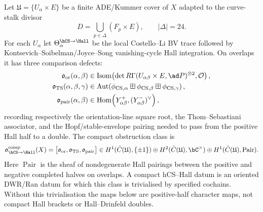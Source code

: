 \begin{definition}
\label{def:k3e-compact-hcs-hall-obstruction}
Let $\mathfrak U=\{U_\alpha\times E\}$ be a finite ADE/Kummer cover of $X$ adapted to the curve-stalk divisor
\[
D=\bigcup_{p\in\Delta}(F_p\times E),\qquad |\Delta|=24.
\]
For each $U_\alpha$ let $\Theta_{\alpha}^{\hCS\to\Hall}$ be the local Costello--Li BV trace followed by Kontsevich--Soibelman/Joyce--Song vanishing-cycle Hall integration. On overlaps it has three comparison defects:
\[
\begin{aligned}
\mathfrak o_{\mathrm{or}}(\alpha,\beta)
&\in \operatorname{Isom}\!\left(\det R\Gamma(U_{\alpha\beta}\times E,\ad P)^{\otimes 2},\mathcal O\right),\\
\mathfrak o_{\mathrm{TS}}(\alpha,\beta,\gamma)
&\in \operatorname{Aut}\!\left(\phi_{\mathrm{CS},\alpha}\boxplus\phi_{\mathrm{CS},\beta}\boxplus\phi_{\mathrm{CS},\gamma}\right),\\
\mathfrak o_{\mathrm{pair}}(\alpha,\beta)
&\in \operatorname{Hom}\!\left(Y^+_{\alpha\beta},(Y^-_{\alpha\beta})^\vee\right),
\end{aligned}
\]
recording respectively the orientation-line square root, the Thom--Sebastiani associator, and the Hopf/stable-envelope pairing needed to pass from the positive Hall half to a double. The compact obstruction class is
\[
\mathfrak o_{\hCS\to\Hall}^{\mathrm{comp}}(X)
=\bigl[\mathfrak o_{\mathrm{or}},\mathfrak o_{\mathrm{TS}},\mathfrak o_{\mathrm{pair}}\bigr]
\in
H^1(\check C(\mathfrak U),\{\pm1\})\oplus
H^2(\check C(\mathfrak U),\bC^\times)\oplus
H^1(\check C(\mathfrak U),\operatorname{Pair}).
\]
Here $\operatorname{Pair}$ is the sheaf of nondegenerate Hall pairings between the positive and negative completed halves on overlaps.
A compact hCS--Hall datum is an oriented DWR/Ran datum for which this class is trivialised by specified cochains. Without this trivialisation the maps below are positive-half character maps, not compact Hall brackets or Hall--Drinfeld doubles.
\end{definition}

